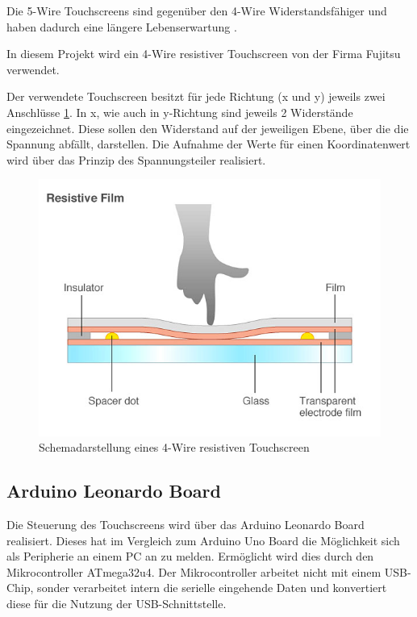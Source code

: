 Die 5-Wire Touchscreens sind gegenüber den 4-Wire Widerstandsfähiger und haben dadurch eine längere Lebenserwartung \cite{5w4w}.

In diesem Projekt wird ein 4-Wire resistiver Touchscreen von der Firma Fujitsu verwendet.

Der verwendete Touchscreen besitzt für jede Richtung (x und y) jeweils zwei Anschlüsse \cref{fig:4w}.
In x, wie auch in y-Richtung sind jeweils 2 Widerstände eingezeichnet.
Diese sollen den Widerstand auf der jeweiligen Ebene, über die die Spannung abfällt, darstellen.
Die Aufnahme der Werte für einen Koordinatenwert wird über das Prinzip des Spannungsteiler realisiert.
\begin{figure}
    \centering
    \includegraphics[width=0.6\linewidth]{fig/raster/4_wire_resistive_touch_screen.jpeg}
    \caption{Schemadarstellung eines 4-Wire resistiven Touchscreen \cite{4wschema}}
    \label{fig:4w}
\end{figure}
\subsection{Arduino Leonardo Board}
Die Steuerung des Touchscreens wird über das Arduino Leonardo Board realisiert. 
Dieses hat im Vergleich zum Arduino Uno Board die Möglichkeit sich als Peripherie an einem PC an zu melden.
Ermöglicht wird dies durch den Mikrocontroller ATmega32u4.
Der Mikrocontroller arbeitet nicht mit einem USB-Chip, sonder verarbeitet intern die serielle eingehende Daten und konvertiert diese für die Nutzung der USB-Schnittstelle.




